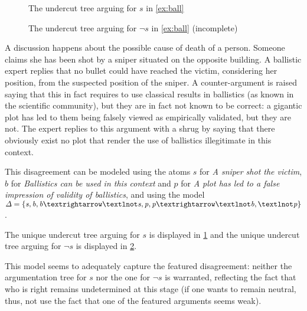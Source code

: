 \documentclass[version=3.21, pagesize, twoside=off, bibliography=totoc, DIV=calc, fontsize=12pt, a4paper, french, english]{scrartcl}
\begin{document}
\begin{figure}
	\caption{The undercut tree arguing for $\mathit{s}$ in \cref{ex:ball}}
	\label{fig:ball}
\end{figure}
\begin{figure}
	\caption{The undercut tree arguing for $¬\mathit{s}$ in \cref{ex:ball} (incomplete)}
	\label{fig:ballnot}
\end{figure}
\begin{example}
	\label{ex:ball}
	A discussion happens about the possible cause of death of a person. Someone claims she has been shot by a sniper situated on the opposite building. A ballistic expert replies that no bullet could have reached the victim, considering her position, from the suspected position of the sniper. A counter-argument is raised saying that this in fact requires to use classical results in ballistics (as known in the scientific community), but they are in fact not known to be correct: a gigantic plot has led to them being falsely viewed as empirically validated, but they are not. The expert replies to this argument with a shrug by saying that there obviously exist no plot that render the use of ballistics illegitimate in this context.
	
	This disagreement can be modeled using the atoms 
	$\mathit{s}$ for \emph{A sniper shot the victim}, 
	$\mathit{b}$ for \emph{Ballistics can be used in this context} and 
	$\mathit{p}$ for \emph{A plot has led to a false impression of validity of ballistics}, 
	and using the model 
	$\Delta = \set{\mathit{s},\allowbreak \mathit{b}, \mathit{b} → ¬\mathit{s}, \mathit{p}, \mathit{p} → ¬\mathit{b}, ¬\mathit{p}}$.
	
	The unique undercut tree arguing for $\mathit{s}$ is displayed in \cref{fig:ball} and the unique undercut tree arguing for $¬\mathit{s}$ is displayed in \cref{fig:ballnot}.
\end{example}
This model seems to adequately capture the featured disagreement: neither the argumentation tree for $\mathit{s}$ nor the one for $¬\mathit{s}$ is warranted, reflecting the fact that who is right remains undetermined at this stage (if one wants to remain neutral, thus, not use the fact that one of the featured arguments seems weak).
\end{document}
